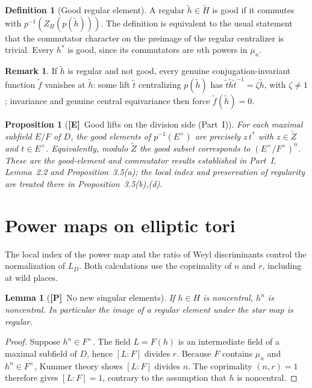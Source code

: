 \documentclass[11pt]{article}
\newcommand{\tH}{\widetilde H}
\newcommand{\tZ}{\widetilde Z}
\newcommand{\Ptag}{\textnormal{\textbf{[P]}}}
\newcommand{\Etag}{\textnormal{\textbf{[E]}}}
\theoremstyle{plain}
\newtheorem{lemma}[theorem]{Lemma}
\newtheorem{proposition}[theorem]{Proposition}
\theoremstyle{definition}
\newtheorem{definition}[theorem]{Definition}
\newtheorem{remark}[theorem]{Remark}
\begin{document}
\begin{definition}[Good regular element]\label{def:good}
A regular $\widetilde h\in\tH$ is good if it commutes with $p^{-1}(Z_H(p(\widetilde h)))$. The definition is equivalent to the usual statement that the commutator character on the preimage of the regular centralizer is trivial. Every $h^*$ is good, since its commutators are $n$th powers in $\mu_n$.
\end{definition}

\begin{remark}\label{rem:good-vanish}
If $\widetilde h$ is regular and not good, every genuine conjugation-invariant function $\widetilde f$ vanishes at $\widetilde h$: some lift $\widetilde t$ centralizing $p(\widetilde h)$ has $\widetilde t\widetilde h\widetilde t^{-1}=\zeta\widetilde h$, with $\zeta\neq1$; invariance and genuine central equivariance then force $\widetilde f(\widetilde h)=0$.
\end{remark}

\begin{proposition}[\Etag\ Good lifts on the division side (Part~I)]\label{prop:good}
For each maximal subfield $E/F$ of $D$, the good elements of
$p^{-1}(E^\times)$ are precisely $z\,t^*$ with $z\in\tZ$ and
$t\in E^\times$. Equivalently, modulo $\tZ$ the good subset
corresponds to $(E^\times/F^\times)^n$. These are the good-element
and commutator results established in Part~I, Lemma~2.2 and
Proposition~3.5(a); the local index and preservation of regularity
are treated there in Proposition~3.5(b),(d).
\end{proposition}

\section{Power maps on elliptic tori}\label{sec:power}
The local index of the power map and the ratio of Weyl discriminants
control the normalization of $L_D$. Both calculations use the
coprimality of $n$ and $r$, including at wild places.
\begin{lemma}[\Ptag\ No new singular elements]\label{lem:regular}
If $h\in H$ is noncentral, $h^n$ is noncentral. In particular the image of a regular element under the star map is regular.
\end{lemma}
\begin{proof}
Suppose $h^n\in F^\times$. The field $L=F(h)$ is an intermediate field of a maximal subfield of $D$, hence $[L:F]$ divides $r$. Because $F$ contains $\mu_n$ and $h^n\in F^\times$, Kummer theory shows $[L:F]$ divides $n$. The coprimality $(n,r)=1$ therefore gives $[L:F]=1$, contrary to the assumption that $h$ is noncentral.
\end{proof}
\end{document}
